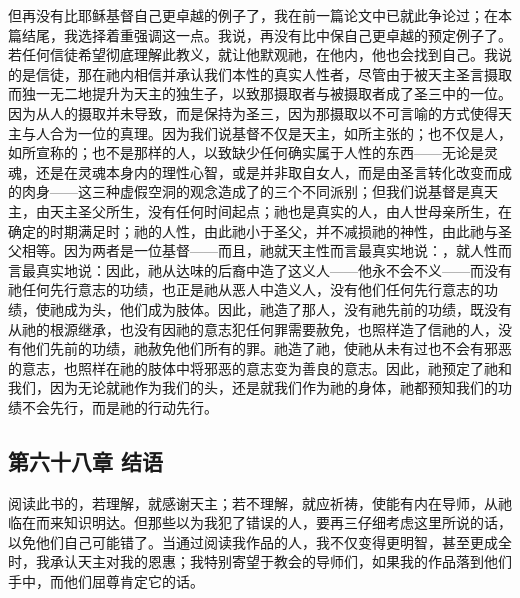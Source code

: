 但再没有比耶稣基督自己更卓越的例子了，我在前一篇论文中已就此争论过；在本篇结尾，我选择着重强调这一点。我说，再没有比中保自己更卓越的预定例子了。若任何信徒希望彻底理解此教义，就让他默观祂，在他内，他也会找到自己。我说的是信徒，那在祂内相信并承认我们本性的真实人性者，尽管由于被天主圣言摄取而独一无二地提升为天主的独生子，以致那摄取者与被摄取者成了圣三中的一位。因为从人的摄取并未导致，而是保持为圣三，因为那摄取以不可言喻的方式使得天主与人合为一位的真理。因为我们说基督不仅是天主，如所主张的；也不仅是人，如所宣称的；也不是那样的人，以致缺少任何确实属于人性的东西——无论是灵魂，还是在灵魂本身内的理性心智，或是并非取自女人，而是由圣言转化改变而成的肉身——这三种虚假空洞的观念造成了的三个不同派别；但我们说基督是真天主，由天主圣父所生，没有任何时间起点；祂也是真实的人，由人世母亲所生，在确定的时期满足时；祂的人性，由此祂小于圣父，并不减损祂的神性，由此祂与圣父相等。因为两者是一位基督——而且，祂就天主性而言最真实地说：，就人性而言最真实地说：因此，祂从达味的后裔中造了这义人——他永不会不义——而没有祂任何先行意志的功绩，也正是祂从恶人中造义人，没有他们任何先行意志的功绩，使祂成为头，他们成为肢体。因此，祂造了那人，没有祂先前的功绩，既没有从祂的根源继承，也没有因祂的意志犯任何罪需要赦免，也照样造了信祂的人，没有他们先前的功绩，祂赦免他们所有的罪。祂造了祂，使祂从未有过也不会有邪恶的意志，也照样在祂的肢体中将邪恶的意志变为善良的意志。因此，祂预定了祂和我们，因为无论就祂作为我们的头，还是就我们作为祂的身体，祂都预知我们的功绩不会先行，而是祂的行动先行。\par


\subsection{第六十八章 结语}

阅读此书的，若理解，就感谢天主；若不理解，就应祈祷，使能有内在导师，从祂临在而来知识明达。但那些以为我犯了错误的人，要再三仔细考虑这里所说的话，以免他们自己可能错了。当通过阅读我作品的人，我不仅变得更明智，甚至更成全时，我承认天主对我的恩惠；我特别寄望于教会的导师们，如果我的作品落到他们手中，而他们屈尊肯定它的话。\par

